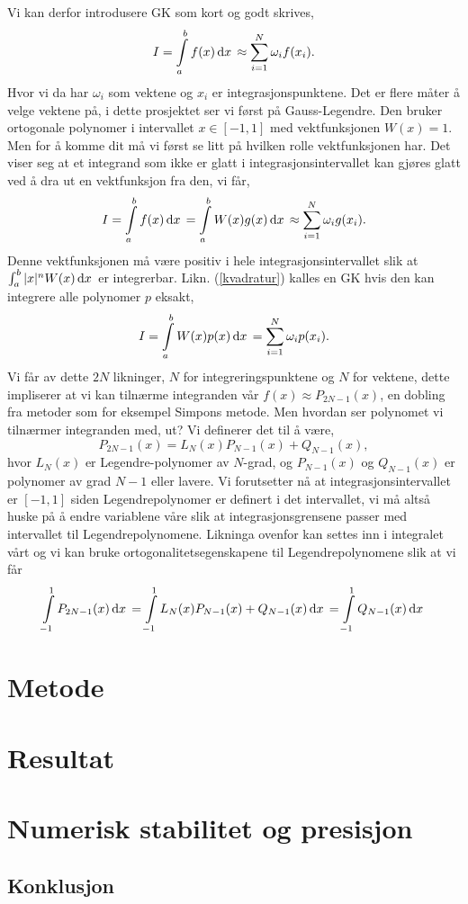 \documentclass[norsk, 10pt,twocolumn]{article}
\newcommand{\dx}{\, {\rm d}x\, }
\begin{document}
Vi kan derfor introdusere GK som kort og godt skrives,
\begin{equation}
	I = \int\limits_{a}^b f(x) \dx \approx \sum\limits_{i=1}^N \omega_i f(x_i).
\end{equation}
Hvor vi da har $\omega_i$ som vektene og $x_i$ er integrasjonspunktene. Det er flere måter å velge vektene på, i dette prosjektet ser vi først på Gauss-Legendre. Den bruker ortogonale polynomer i intervallet $x\in[-1,1]$ med vektfunksjonen $W(x) = 1$. Men for å komme dit må vi først se litt på hvilken rolle vektfunksjonen har. Det viser seg at et integrand som ikke er glatt i integrasjonsintervallet kan gjøres glatt ved å dra ut en vektfunksjon fra den, vi får,
\begin{align}
	I = \int\limits_{a}^b f(x) \dx = \int\limits_{a}^b W(x)g(x) \dx \approx \sum\limits_{i=1}^N \omega_i g(x_i). \label{kvadratur}
\end{align}
Denne vektfunksjonen må  være positiv i hele integrasjonsintervallet slik at $\int_a^b |x|^n W(x)\dx$ er integrerbar. Likn. (\ref{kvadratur}) kalles en GK hvis den kan integrere alle polynomer $p$ eksakt,
$$ 	I = \int\limits_{a}^b W(x)p(x) \dx = \sum\limits_{i=1}^N \omega_i p(x_i). $$
Vi får av dette $2N$ likninger, $N$ for integreringspunktene og $N$ for vektene, dette impliserer at vi kan tilnærme integranden vår $f(x) \approx P_{2N-1}(x)$, en dobling fra metoder som for eksempel Simpons metode. Men hvordan ser polynomet vi tilnærmer integranden med, ut? Vi definerer det til å være,
\begin{equation}
	P_{2N-1} (x) = L_N(x)P_{N-1}(x) + Q_{N-1}(x),
\end{equation}
hvor $L_N(x)$ er Legendre-polynomer av $N$-grad, og $P_{N-1}(x)$ og $Q_{N-1}(x)$ er polynomer av grad $N-1$ eller lavere. Vi forutsetter nå at integrasjonsintervallet er $[-1,1]$ siden Legendrepolynomer er definert i det intervallet, vi må altså huske på å endre variablene våre slik at integrasjonsgrensene passer med intervallet til Legendrepolynomene. Likninga ovenfor kan settes inn i integralet vårt og vi kan bruke ortogonalitetsegenskapene til Legendrepolynomene slik at vi får
\begin{equation}
	\int\limits_{-1}^1 P_{2N-1} (x) \dx = \int\limits_{-1}^1 L_N(x)P_{N-1}(x) + Q_{N-1}(x) \dx = \int\limits_{-1}^1  Q_{N-1}(x) \dx
\end{equation}

\section*{Metode}

\section*{Resultat}

\section*{Numerisk stabilitet og presisjon}

\subsection*{Konklusjon}
\end{document}
